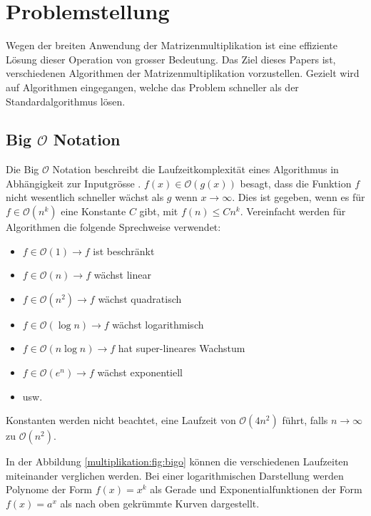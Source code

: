 %
%
%
\section{Problemstellung}
Wegen der breiten Anwendung der Matrizenmultiplikation ist eine effiziente L\"osung dieser Operation von grosser Bedeutung.
Das Ziel dieses Papers ist, verschiedenen Algorithmen der Matrizenmultiplikation vorzustellen.
Gezielt wird auf Algorithmen eingegangen, welche das Problem schneller als der Standardalgorithmus l\"osen.

\subsection{Big $\mathcal{O}$ Notation}
\label{muliplikation:sec:bigo}
Die Big $\mathcal{O}$ Notation beschreibt die Laufzeitkomplexit\"at eines Algorithmus in Abhängigkeit zur Inputgrösse \cite{multiplikation:bigo}.
$f(x) \in \mathcal{O}(g(x))$ besagt, dass die Funktion $f$ nicht wesentlich schneller w\"achst als $g$ wenn $x \rightarrow \infty$.
Dies ist gegeben, wenn es für $f \in \mathcal{O}(n^k)$ eine Konstante $C$ gibt, mit $f(n) \leq Cn^k$.
Vereinfacht werden f\"ur Algorithmen die folgende Sprechweise verwendet:
\begin{itemize}
	\item $f \in \mathcal{O}(1) \rightarrow f$ ist beschr\"ankt
	\item $f \in \mathcal{O}(n) \rightarrow f$ w\"achst linear
	\item $f \in \mathcal{O}  (n^2   ) \rightarrow f$ w\"achst quadratisch
	\item $f \in \mathcal{O}(\log n) \rightarrow f$ w\"achst logarithmisch
	\item $f \in \mathcal{O}(n \log n) \rightarrow f$ hat super-lineares Wachstum
	\item $f \in \mathcal{O}  (e^n   ) \rightarrow f$ w\"achst exponentiell
	\item usw.
\end{itemize}

Konstanten werden nicht beachtet, eine Laufzeit von  $\mathcal{O}(4n^2)$ führt, falls $n \rightarrow \infty$ zu $\mathcal{O}(n^2)$.

In der Abbildung \ref{multiplikation:fig:bigo} k\"onnen die verschiedenen Laufzeiten miteinander verglichen werden.
Bei einer logarithmischen Darstellung werden Polynome der Form $f(x) = x^k$ als Gerade und Exponentialfunktionen der Form $f(x) = a^x$ als nach oben gekr\"ummte Kurven dargestellt.



